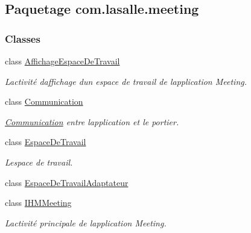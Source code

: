 \hypertarget{namespacecom_1_1lasalle_1_1meeting}{}\subsection{Paquetage com.\+lasalle.\+meeting}
\label{namespacecom_1_1lasalle_1_1meeting}
\subsubsection*{Classes}
\begin{DoxyCompactItemize}
\item 
class \hyperlink{classcom_1_1lasalle_1_1meeting_1_1_affichage_espace_de_travail}{Affichage\+Espace\+De\+Travail}
\begin{DoxyCompactList}\small\item\em L\textquotesingle{}activité d\textquotesingle{}affichage d\textquotesingle{}un espace de travail de l\textquotesingle{}application Meeting. \end{DoxyCompactList}\item 
class \hyperlink{classcom_1_1lasalle_1_1meeting_1_1_communication}{Communication}
\begin{DoxyCompactList}\small\item\em \hyperlink{classcom_1_1lasalle_1_1meeting_1_1_communication}{Communication} entre l\textquotesingle{}application et le portier. \end{DoxyCompactList}\item 
class \hyperlink{classcom_1_1lasalle_1_1meeting_1_1_espace_de_travail}{Espace\+De\+Travail}
\begin{DoxyCompactList}\small\item\em L\textquotesingle{}espace de travail. \end{DoxyCompactList}\item 
class \hyperlink{classcom_1_1lasalle_1_1meeting_1_1_espace_de_travail_adaptateur}{Espace\+De\+Travail\+Adaptateur}
\item 
class \hyperlink{classcom_1_1lasalle_1_1meeting_1_1_i_h_m_meeting}{I\+H\+M\+Meeting}
\begin{DoxyCompactList}\small\item\em L\textquotesingle{}activité principale de l\textquotesingle{}application Meeting. \end{DoxyCompactList}\end{DoxyCompactItemize}
